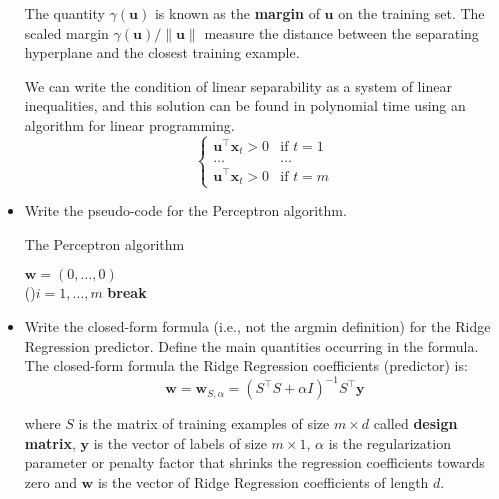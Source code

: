 \begin{itemize}
        The quantity $\gamma(\boldsymbol{u})$ is known as the \textbf{margin} of $\boldsymbol{u}$ on the training set. The scaled margin $\gamma(\boldsymbol{u}) / \lVert\boldsymbol{u}\lVert$ measure the distance between the separating hyperplane and the closest training example.

        We can write the condition of linear separability as a system of linear inequalities, and this solution can be found in polynomial time using an algorithm for linear programming.\\
        $$
        \begin{cases}
            \boldsymbol{u}^{\top}\boldsymbol{x}_t > 0 & \text{if } t = 1\\
            \dots & \dots\\
            \boldsymbol{u}^{\top}\boldsymbol{x}_t > 0 & \text{if } t = m
        \end{cases}
        $$
    
    \item Write the pseudo-code for the Perceptron algorithm.\\

        \begin{algorithm}[H]
            \SetAlgoLined
            \DontPrintSemicolon
            \caption{The Perceptron algorithm}
            $\boldsymbol{w} = (0, \dots, 0)$\\
         {  
            \For(){$i = 1, \dots, m$}{
            }
             {
                \textbf{break}
            } 
           }
        \end{algorithm}

    \item Write the closed-form formula (i.e., not the argmin definition) for the Ridge Regression predictor. Define the main quantities occurring in the formula.\\

        The closed-form formula the Ridge Regression coefficients (predictor) is:
        $$
        \boldsymbol{w} = \boldsymbol{w}_{S, \alpha} = (S^{\top} S + \alpha I)^{-1}S^{\top}\boldsymbol{y}
        $$
   
        where $S$ is the matrix of training examples of size $m \times d$ called \textbf{design matrix}, $\boldsymbol{y}$ is the vector of labels of size $m \times 1$, $\alpha$ is the regularization parameter or penalty factor that shrinks the regression coefficients towards zero and $\boldsymbol{w}$ is the vector of Ridge Regression coefficients of length $d$.\\


\end{itemize}
